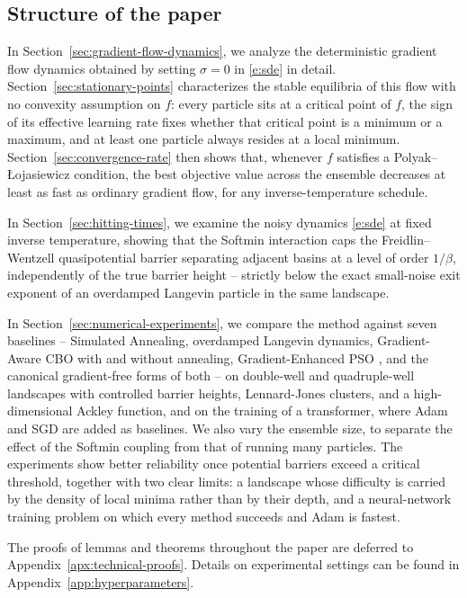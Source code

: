 \documentclass{article}
\theoremstyle{plain}
\theoremstyle{definition}
\theoremstyle{remark}
\begin{document}
\subsection{Structure of the paper}
In Section~\ref{sec:gradient-flow-dynamics}, we analyze the deterministic gradient flow dynamics obtained by setting $\sigma =0$ in \eqref{e:sde} in detail. Section~\ref{sec:stationary-points} characterizes the stable equilibria of this flow with no convexity assumption on $f$: every particle sits at a critical point of $f$, the sign of its effective learning rate fixes whether that critical point is a minimum or a maximum, and at least one particle always resides at a local minimum. Section~\ref{sec:convergence-rate} then shows that, whenever $f$ satisfies a Polyak--\L{}ojasiewicz condition, the best objective value across the ensemble decreases at least as fast as ordinary gradient flow, for any inverse-temperature schedule.

In Section~\ref{sec:hitting-times}, we examine the noisy dynamics \eqref{e:sde} at fixed inverse temperature, showing that the Softmin interaction caps the Freidlin--Wentzell quasipotential barrier separating adjacent basins at a level of order $1/\beta$, independently of the true barrier height -- strictly below the exact small-noise exit exponent of an overdamped Langevin particle in the same landscape.

In Section~\ref{sec:numerical-experiments}, we compare the method against seven baselines -- Simulated Annealing, overdamped Langevin dynamics, Gradient-Aware CBO \cite{carrillo2021consensus} with and without annealing, Gradient-Enhanced PSO \cite{noel2012new}, and the canonical gradient-free forms of both -- on double-well and quadruple-well landscapes with controlled barrier heights, Lennard-Jones clusters, and a high-dimensional Ackley function, and on the training of a transformer, where Adam and SGD are added as baselines. We also vary the ensemble size, to separate the effect of the Softmin coupling from that of running many particles. The experiments show better reliability once potential barriers exceed a critical threshold, together with two clear limits: a landscape whose difficulty is carried by the density of local minima rather than by their depth, and a neural-network training problem on which every method succeeds and Adam is fastest.

The proofs of lemmas and theorems throughout the paper are deferred to Appendix~\ref{apx:technical-proofs}. Details on experimental settings can be found in Appendix~\ref{app:hyperparameters}.
\end{document}
